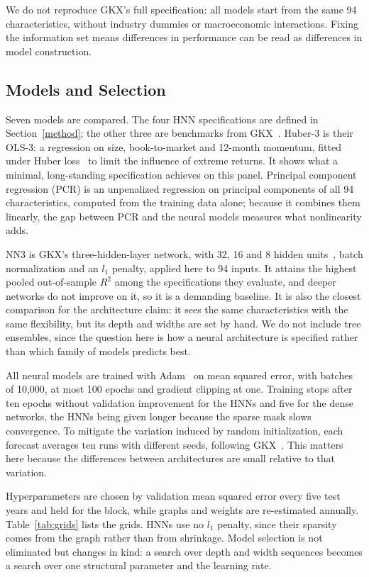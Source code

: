 \documentclass[sigconf,nonacm]{acmart}
\newcommand{\NNThree}{\textsc{NN3}}
\begin{document}
We do not reproduce GKX's full specification: all models start from the same 94
characteristics, without industry dummies or macroeconomic interactions. Fixing
the information set means differences in performance can be read as differences
in model construction.

\subsection{Models and Selection}

Seven models are compared. The four HNN specifications are defined in
Section~\ref{method}; the other three are benchmarks from GKX~\cite{gu2020}.
Huber-3 is their OLS-3: a regression on size, book-to-market and 12-month
momentum, fitted under Huber loss~\cite{huber1964} to limit the influence of
extreme returns. It shows what a minimal, long-standing specification achieves
on this panel. Principal component regression (PCR) is an unpenalized regression
on principal components of all 94 characteristics, computed from the training
data alone; because it combines them linearly, the gap between PCR and the
neural models measures what nonlinearity adds.

\NNThree{} is GKX's three-hidden-layer network, with 32, 16 and 8 hidden units~\cite{gu2020}, batch
normalization and an \(l_1\) penalty, applied here to 94 inputs. It attains the
highest pooled out-of-sample \(R^2\) among the specifications they evaluate, and
deeper networks do not improve on it, so it is a demanding baseline. It is also
the closest comparison for the architecture claim: it sees the same
characteristics with the same flexibility, but its depth and widths are set by
hand. We do not include tree ensembles, since the question here is how a neural
architecture is specified rather than which family of models predicts best.

All neural models are trained with Adam~\cite{kingma2015} on mean squared error,
with batches of 10{,}000, at most 100 epochs and gradient clipping at one.
Training stops after ten epochs without validation improvement for the HNNs and
five for the dense networks, the HNNs being given longer because the sparse mask
slows convergence. To mitigate the variation induced by random initialization, each forecast averages ten runs with different seeds, following GKX~\cite{gu2020}. This matters here because the differences between architectures are small relative to that variation.

Hyperparameters are chosen by validation mean squared error every five test
years and held for the block, while graphs and weights are re-estimated
annually. Table~\ref{tab:grids} lists the grids. HNNs use no \(l_1\)
penalty, since their sparsity comes from the graph rather than from shrinkage.
Model selection is not eliminated but changes in kind: a search over depth and
width sequences becomes a search over one structural parameter and the learning
rate.
\end{document}
